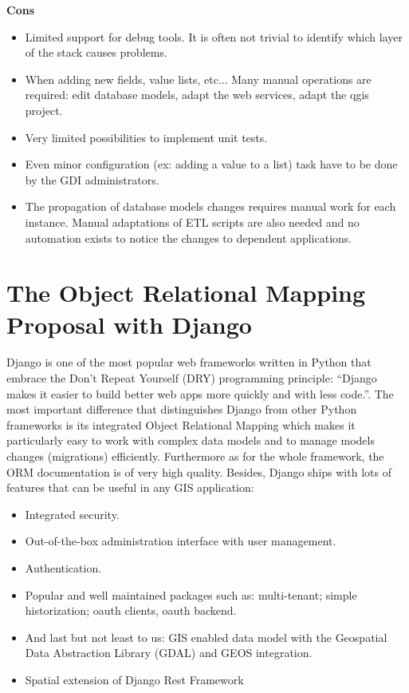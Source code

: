 \documentclass[runningheads]{llncs}
\begin{document}
\textbf{Cons} 
\begin{itemize}
	\item Limited support for debug tools. It is often not trivial to identify which layer of the stack causes problems.
	\item When adding new fields, value lists, etc... Many manual operations are required: edit database models, adapt the web services, adapt the qgis project.
	\item Very limited possibilities to implement unit tests.
	\item Even minor configuration (ex: adding a value to a list) task have to be done by the GDI administrators.
	\item The propagation of database models changes requires manual work for each instance. Manual adaptations of ETL scripts are also needed and no automation exists to notice the changes to dependent applications.
\end{itemize}


\section{The Object Relational Mapping Proposal with Django}

Django is one of the most popular web frameworks written in Python that embrace the Don’t Repeat Yourself (DRY) programming principle: “Django makes it easier to build better web apps more quickly and with less code.”\cite{ref_django}. The most important difference that distinguishes Django from other Python frameworks is its integrated Object Relational Mapping which makes it particularly easy to work with complex data models and to manage models changes (migrations) efficiently. Furthermore as for the whole framework, the ORM documentation is of very high quality. Besides, Django ships with lots of features that can be useful in any GIS application: 

\begin{itemize}
	\item Integrated security.
	\item Out-of-the-box administration interface with user management. 
	\item Authentication.
	\item Popular and well maintained packages such as: multi-tenant; simple historization; oauth clients, oauth backend.
	\item And last but not least to us: GIS enabled data model with the Geospatial Data Abstraction Library (GDAL) and GEOS integration.
	\item Spatial extension of Django Rest Framework
\end{itemize}
\end{document}
